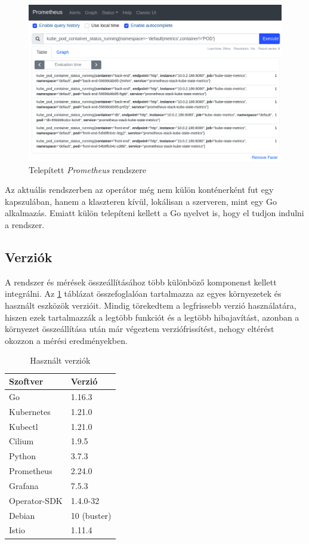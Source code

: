 \begin{figure}[!ht]
\centering
\includegraphics[width=150mm, keepaspectratio]{figures/prometheus_example.png}
\caption{Telepített \textit{Prometheus} rendszere}
\label{fig:prometheus_example}
\end{figure}

Az aktuális rendszerben az operátor még nem külön konténerként fut egy kapszulában, hanem a klaszteren kívül, lokálisan a szerveren, mint egy Go alkalmazás. Emiatt külön telepíteni kellett a Go nyelvet is, hogy el tudjon indulni a rendszer.

\subsection{Verziók}
A rendszer és mérések összeállításához több különböző komponenst kellett integrálni.
Az \ref{tab:versions} táblázat összefoglalóan tartalmazza az egyes környezetek és használt eszközök verzióit. 
Mindig törekedtem a legfrissebb verzió használatára, hiszen ezek tartalmazzák a legtöbb funkciót és a legtöbb hibajavítást, azonban a környezet összeállítása után már végeztem verziófrissítést, nehogy eltérést okozzon a mérési eredményekben.

\begin{table}[ht]
\centering
  \begin{tabular}{l l}
	  Szoftver 		& Verzió \\
    \hline
      Go 			& 1.16.3 \\ 
      Kubernetes 	& 1.21.0 \\ 
      Kubectl 		& 1.21.0 \\
      Cilium 		& 1.9.5 \\
      Python 		& 3.7.3 \\ 
      Prometheus 	& 2.24.0 \\ 
      Grafana 		& 7.5.3 \\ 
      Operator-SDK 	& 1.4.0-32 \\ 
      Debian 		& 10 (buster)  \\ 
      Istio			& 1.11.4 \\
  \end{tabular}
  
  \caption{Használt verziók}
\label{tab:versions}
\end{table}


